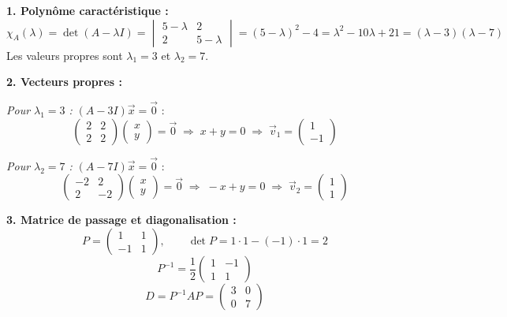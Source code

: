 \documentclass[12pt,a4paper]{article}
\begin{document}
\begin{boitecorrige}
\textbf{1. Polynôme caractéristique :}
\[
\chi_A(\lambda) = \det(A - \lambda I) = \begin{vmatrix}5-\lambda & 2 \\ 2 & 5-\lambda\end{vmatrix}
= (5-\lambda)^2 - 4 = \lambda^2 - 10\lambda + 21 = (\lambda-3)(\lambda-7)
\]
Les valeurs propres sont $\lambda_1 = 3$ et $\lambda_2 = 7$.

\textbf{2. Vecteurs propres :}

\textit{Pour $\lambda_1 = 3$ :} $(A-3I)\vec{x} = \vec{0}$ :
\[
\begin{pmatrix}2 & 2 \\ 2 & 2\end{pmatrix}\begin{pmatrix}x\\y\end{pmatrix} = \vec{0} \;\Rightarrow\; x+y=0 \;\Rightarrow\; \vec{v}_1 = \begin{pmatrix}1\\-1\end{pmatrix}
\]

\textit{Pour $\lambda_2 = 7$ :} $(A-7I)\vec{x} = \vec{0}$ :
\[
\begin{pmatrix}-2 & 2 \\ 2 & -2\end{pmatrix}\begin{pmatrix}x\\y\end{pmatrix} = \vec{0} \;\Rightarrow\; -x+y=0 \;\Rightarrow\; \vec{v}_2 = \begin{pmatrix}1\\1\end{pmatrix}
\]

\textbf{3. Matrice de passage et diagonalisation :}
\[
P = \begin{pmatrix}1 & 1 \\ -1 & 1\end{pmatrix}, \qquad \det P = 1\cdot1-(-1)\cdot1 = 2
\]
\[
P^{-1} = \frac{1}{2}\begin{pmatrix}1 & -1 \\ 1 & 1\end{pmatrix}
\]
\[
D = P^{-1}AP = \begin{pmatrix}3 & 0 \\ 0 & 7\end{pmatrix}
\]


\end{boitecorrige}
\end{document}
